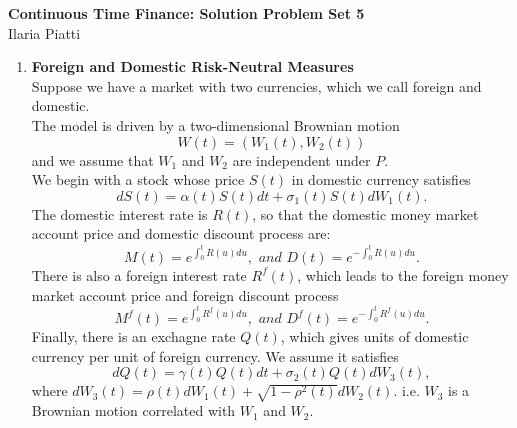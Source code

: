 \documentclass[11pt,a4,table]{article}
\begin{document}
\vspace*{-0.7in}

\begin{center}
 \textbf{Continuous Time Finance: Solution Problem Set 5} \\
Ilaria Piatti 
\end{center} 


\begin{enumerate}
    \item \textbf{Foreign and Domestic Risk-Neutral Measures}\\
    Suppose we have a market with two currencies, which we call foreign and domestic.\\
    The model is driven by a two-dimensional Brownian motion
    \begin{equation*}
        W(t) = (W_1(t), W_2(t))
    \end{equation*}
    and we assume that $W_1$ and $W_2$ are independent under $P$.\\
    We begin with a stock whose price $S(t)$ in domestic currency satisfies
    \begin{equation}
        dS(t) = \alpha(t) S(t) dt + \sigma_1(t) S(t) dW_1(t).
    \end{equation}
    The domestic interest rate is $R(t)$, so that the domestic money market account price and domestic discount process are:
    \begin{equation*}
        M(t) = e^{\int_0^t R(u) du}, \textit{ and } D(t) = e^{-\int_0^t R(u) du}.
    \end{equation*}
    There is also a foreign interest rate $R^f(t)$, which leads to the foreign money market account price and foreign discount process
    \begin{equation*}
        M^f(t)=e^{\int_0^t R^f(u) du}, \textit{ and } D^f(t) = e^{-\int_0^t R^f(u) du}.
    \end{equation*}
    Finally, there is an exchagne rate $Q(t)$, which gives units of domestic currency per unit of foreign currency. We assume it satisfies
    \begin{equation}
        dQ(t) = \gamma(t)Q(t) dt + \sigma_2(t) Q(t) dW_3(t),
    \end{equation}
    where $dW_3(t) = \rho(t) dW_1(t) + \sqrt{1-\rho^2(t)} dW_2(t)$. i.e. $W_3$ is a Brownian motion correlated with $W_1$ and $W_2$.
    

\end{enumerate}
\end{document}
